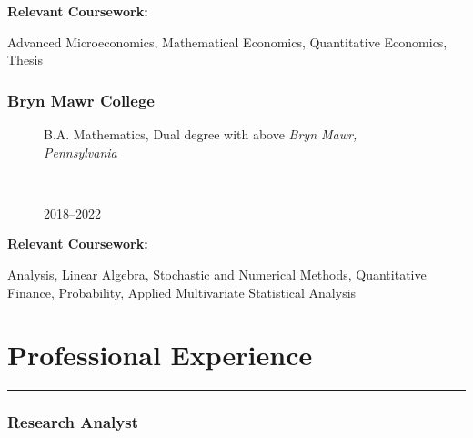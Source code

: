 \documentclass[
  letterpaper,
  DIV=11,
  numbers=noendperiod]{scrartcl}
\let\oldrule=\rule
\renewcommand{\rule}[1]{\oldrule{\linewidth}}
\begin{document}
\textbf{Relevant Coursework:}

Advanced Microeconomics, Mathematical Economics, Quantitative Economics,
Thesis

\hypertarget{bryn-mawr-college}{%
\subsubsection{Bryn Mawr College}\label{bryn-mawr-college}}

\begin{figure}

\begin{minipage}[t]{0.49\linewidth}

{\centering 

\RaggedRight B.A. Mathematics, Dual degree with above \newline
\emph{Bryn Mawr, Pennsylvania}

}

\end{minipage}%
%
\begin{minipage}[t]{0.02\linewidth}

{\centering 

~

}

\end{minipage}%
%
\begin{minipage}[t]{0.49\linewidth}

{\centering 

\RaggedLeft

2018--2022

}

\end{minipage}%

\end{figure}

\textbf{Relevant Coursework:}

Analysis, Linear Algebra, Stochastic and Numerical Methods, Quantitative
Finance, Probability, Applied Multivariate Statistical Analysis

\hypertarget{professional-experience}{%
\section{Professional Experience}\label{professional-experience}}

\begin{center}\rule{0.5\linewidth}{0.5pt}\end{center}

\hypertarget{research-analyst}{%
\subsubsection{Research Analyst}\label{research-analyst}}
\end{document}
